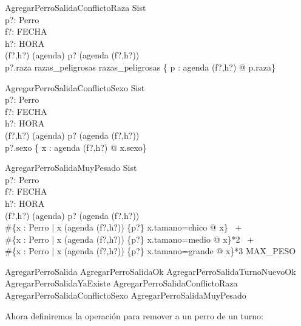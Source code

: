 \documentclass[12pt,zed]{article}
\begin{document}
\begin{schema}{AgregarPerroSalidaConflictoRaza}
\Xi Sist \\
p?: Perro \\
f?: FECHA \\
h?: HORA \\
\where
(f?,h?) \in (\dom agenda) \land p? \notin (agenda (f?,h?)) \\
p?.raza \in razas\_peligrosas \land razas\_peligrosas \cap \{ p : agenda (f?,h?) @ p.raza\} \neq \emptyset \\
\end{schema}

\begin{schema}{AgregarPerroSalidaConflictoSexo}
\Xi Sist \\
p?: Perro \\
f?: FECHA \\
h?: HORA \\
\where
(f?,h?) \in (\dom agenda) \land p? \notin (agenda (f?,h?)) \\
p?.sexo \notin \{ x : agenda (f?,h?) @ x.sexo\}

\end{schema}

\begin{schema}{AgregarPerroSalidaMuyPesado}
\Xi Sist \\
p?: Perro \\
f?: FECHA \\
h?: HORA \\
\where
(f?,h?) \in (\dom agenda) \land p? \notin (agenda (f?,h?)) \\
\#\{x : Perro | x \in (agenda (f?,h?)) \cup \{p?\} \land x.tamano=chico @ x\} \ + \\
\#\{x : Perro | x \in (agenda (f?,h?)) \cup \{p?\} \land x.tamano=medio @ x\}*2 \ + \\
\#\{x : Perro | x \in (agenda (f?,h?)) \cup \{p?\} \land x.tamano=grande @ x\}*3 \geq MAX\_PESO \\
\end{schema}

\begin{zed}
AgregarPerroSalida  AgregarPerroSalidaOk \lor AgregarPerroSalidaTurnoNuevoOk \lor \\ AgregarPerroSalidaYaExiste \lor AgregarPerroSalidaConflictoRaza \lor \\ AgregarPerroSalidaConflictoSexo  \lor AgregarPerroSalidaMuyPesado
\end{zed}

Ahora definiremos la operación para remover a un perro de un turno:
\end{document}
